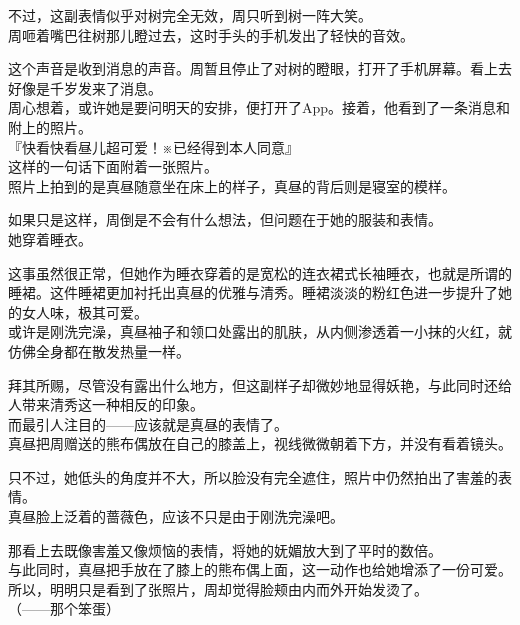 不过，这副表情似乎对树完全无效，周只听到树一阵大笑。\\

周咂着嘴巴往树那儿瞪过去，这时手头的手机发出了轻快的音效。

这个声音是收到消息的声音。周暂且停止了对树的瞪眼，打开了手机屏幕。看上去好像是千岁发来了消息。\\

周心想着，或许她是要问明天的安排，便打开了App。接着，他看到了一条消息和附上的照片。\\

『快看快看昼儿超可爱！※已经得到本人同意』\\

这样的一句话下面附着一张照片。\\

照片上拍到的是真昼随意坐在床上的样子，真昼的背后则是寝室的模样。

如果只是这样，周倒是不会有什么想法，但问题在于她的服装和表情。\\

她穿着睡衣。

这事虽然很正常，但她作为睡衣穿着的是宽松的连衣裙式长袖睡衣，也就是所谓的睡裙。这件睡裙更加衬托出真昼的优雅与清秀。睡裙淡淡的粉红色进一步提升了她的女人味，极其可爱。\\

或许是刚洗完澡，真昼袖子和领口处露出的肌肤，从内侧渗透着一小抹的火红，就仿佛全身都在散发热量一样。

拜其所赐，尽管没有露出什么地方，但这副样子却微妙地显得妖艳，与此同时还给人带来清秀这一种相反的印象。\\

而最引人注目的——应该就是真昼的表情了。\\

真昼把周赠送的熊布偶放在自己的膝盖上，视线微微朝着下方，并没有看着镜头。

只不过，她低头的角度并不大，所以脸没有完全遮住，照片中仍然拍出了害羞的表情。\\

真昼脸上泛着的蔷薇色，应该不只是由于刚洗完澡吧。

那看上去既像害羞又像烦恼的表情，将她的妩媚放大到了平时的数倍。\\

与此同时，真昼把手放在了膝上的熊布偶上面，这一动作也给她增添了一份可爱。所以，明明只是看到了张照片，周却觉得脸颊由内而外开始发烫了。\\

（——那个笨蛋）\\

